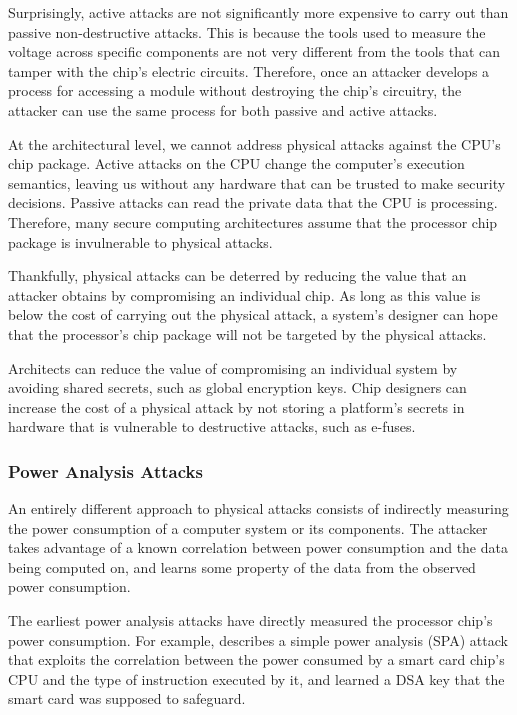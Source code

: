 Surprisingly, active attacks are not significantly more expensive to carry out
than passive non-destructive attacks. This is because the tools used to measure
the voltage across specific components are not very different from the tools
that can tamper with the chip's electric circuits. Therefore, once an attacker
develops a process for accessing a module without destroying the chip's
circuitry, the attacker can use the same process for both passive and active
attacks.

At the architectural level, we cannot address physical attacks against the
CPU's chip package. Active attacks on the CPU change the computer's execution
semantics, leaving us without any hardware that can be trusted to make security
decisions. Passive attacks can read the private data that the CPU is
processing. Therefore, many secure computing architectures assume that the
processor chip package is invulnerable to physical attacks.

Thankfully, physical attacks can be deterred by reducing the value that an
attacker obtains by compromising an individual chip. As long as this value is
below the cost of carrying out the physical attack, a system's designer can
hope that the processor's chip package will not be targeted by the physical
attacks.

Architects can reduce the value of compromising an individual system by
avoiding shared secrets, such as global encryption keys. Chip designers can
increase the cost of a physical attack by not storing a platform's secrets in
hardware that is vulnerable to destructive attacks, such as e-fuses.


\subsubsection{Power Analysis Attacks}
\label{sec:power_analysis_attacks}

An entirely different approach to physical attacks consists of indirectly
measuring the power consumption of a computer system or its components. The
attacker takes advantage of a known correlation between power consumption and
the data being computed on, and learns some property of the data from the
observed power consumption.

The earliest power analysis attacks have directly measured the processor chip's
power consumption. For example, \cite{kocher1999dpa} describes a simple power
analysis (SPA) attack that exploits the correlation between the power consumed
by a smart card chip's CPU and the type of instruction executed by it, and
learned a DSA key that the smart card was supposed to safeguard.

